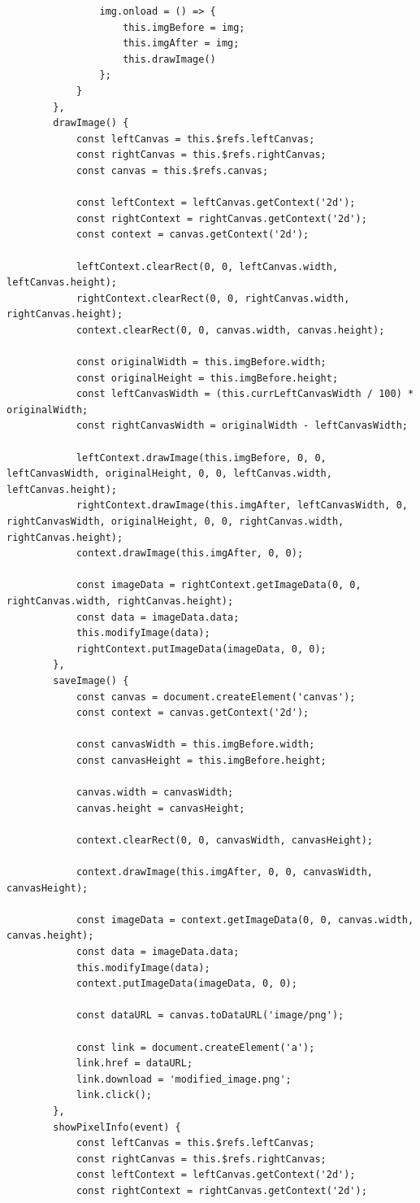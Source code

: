 \documentclass[oneside,14pt]{extarticle}
\begin{document}
\begin{normalsize}
\begin{tiny}
\begin{lstlisting}
				img.onload = () => {
					this.imgBefore = img;
					this.imgAfter = img;
					this.drawImage()
				};
			}
		},
		drawImage() {
			const leftCanvas = this.$refs.leftCanvas;
			const rightCanvas = this.$refs.rightCanvas;
			const canvas = this.$refs.canvas;
			
			const leftContext = leftCanvas.getContext('2d');
			const rightContext = rightCanvas.getContext('2d');
			const context = canvas.getContext('2d');
			
			leftContext.clearRect(0, 0, leftCanvas.width, leftCanvas.height);
			rightContext.clearRect(0, 0, rightCanvas.width, rightCanvas.height);
			context.clearRect(0, 0, canvas.width, canvas.height);
			
			const originalWidth = this.imgBefore.width;
			const originalHeight = this.imgBefore.height;
			const leftCanvasWidth = (this.currLeftCanvasWidth / 100) * originalWidth;
			const rightCanvasWidth = originalWidth - leftCanvasWidth;
			
			leftContext.drawImage(this.imgBefore, 0, 0, leftCanvasWidth, originalHeight, 0, 0, leftCanvas.width, leftCanvas.height);
			rightContext.drawImage(this.imgAfter, leftCanvasWidth, 0, rightCanvasWidth, originalHeight, 0, 0, rightCanvas.width, rightCanvas.height);
			context.drawImage(this.imgAfter, 0, 0);
			
			const imageData = rightContext.getImageData(0, 0, rightCanvas.width, rightCanvas.height);
			const data = imageData.data;
			this.modifyImage(data);
			rightContext.putImageData(imageData, 0, 0);
		},
		saveImage() {
			const canvas = document.createElement('canvas');
			const context = canvas.getContext('2d');
			
			const canvasWidth = this.imgBefore.width;
			const canvasHeight = this.imgBefore.height;
			
			canvas.width = canvasWidth;
			canvas.height = canvasHeight;
			
			context.clearRect(0, 0, canvasWidth, canvasHeight);
			
			context.drawImage(this.imgAfter, 0, 0, canvasWidth, canvasHeight);
			
			const imageData = context.getImageData(0, 0, canvas.width, canvas.height);
			const data = imageData.data;
			this.modifyImage(data);
			context.putImageData(imageData, 0, 0);
			
			const dataURL = canvas.toDataURL('image/png');
			
			const link = document.createElement('a');
			link.href = dataURL;
			link.download = 'modified_image.png';
			link.click();
		},
		showPixelInfo(event) {
			const leftCanvas = this.$refs.leftCanvas;
			const rightCanvas = this.$refs.rightCanvas;
			const leftContext = leftCanvas.getContext('2d');
			const rightContext = rightCanvas.getContext('2d');
			

\end{lstlisting}
\end{tiny}
\end{normalsize}
\end{document}
